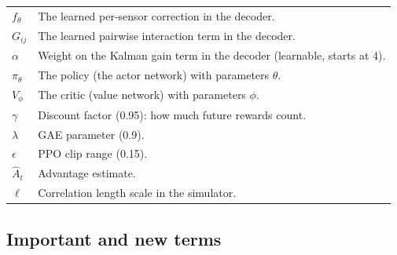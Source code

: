 {\begin{longtable}{@{}p{2.6cm}p{12.8cm}@{}}
$f_\theta$ & The learned per-sensor correction in the decoder. \\
$G_{ij}$ & The learned pairwise interaction term in the decoder. \\
$\alpha$ & Weight on the Kalman gain term in the decoder (learnable, starts at 4). \\
$\pi_\theta$ & The policy (the actor network) with parameters $\theta$. \\
$V_\phi$ & The critic (value network) with parameters $\phi$. \\
$\gamma$ & Discount factor (0.95): how much future rewards count. \\
$\lambda$ & GAE parameter (0.9). \\
$\epsilon$ & PPO clip range (0.15). \\
$\hat A_t$ & Advantage estimate. \\
$\ell$ & Correlation length scale in the simulator. \\
\bottomrule
\end{longtable}
}

\subsection{Important and new terms}


